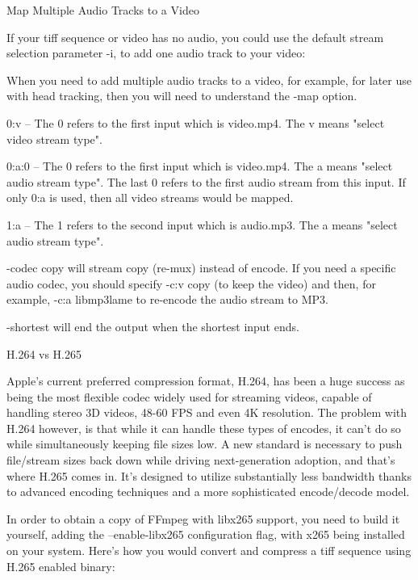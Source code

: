 \begin{fullwidth}
{\large Map Multiple Audio Tracks to a Video \par}

If your tiff sequence or video has no audio, you could use the default stream selection parameter -i, to add one audio track to your video: 


When you need to add multiple audio tracks to a video, for example, for later use with head tracking, then you will need to understand the -map option.


0:v – The 0 refers to the first input which is video.mp4. The v means "select video stream type".

0:a:0 – The 0 refers to the first input which is video.mp4. The a means "select audio stream type". The last 0 refers to the first audio stream from this input. If only 0:a is used, then all video streams would be mapped.

1:a – The 1 refers to the second input which is audio.mp3. The a means "select audio stream type".

-codec copy will stream copy (re-mux) instead of encode. If you need a specific audio codec, you should specify -c:v copy (to keep the video) and then, for example, -c:a libmp3lame to re-encode the audio stream to MP3.

-shortest will end the output when the shortest input ends.

{\large H.264 vs H.265 \par}

Apple’s current preferred compression format, H.264, has been a huge success as being the most flexible codec widely used for streaming videos, capable of handling stereo 3D videos, 48-60 FPS and even 4K resolution. The problem with H.264 however, is that while it can handle these types of encodes, it can’t do so while simultaneously keeping file sizes low. A new standard is necessary to push file/stream sizes back down while driving next-generation adoption, and that’s where H.265 comes in. It’s designed to utilize substantially less bandwidth thanks to advanced encoding techniques and a more sophisticated encode/decode model.

In order to obtain a copy of FFmpeg with libx265 support, you need to build it yourself, adding the --enable-libx265 configuration flag, with x265 being installed on your system. Here’s how you would convert and compress a tiff sequence using H.265 enabled binary:


\end{fullwidth}
